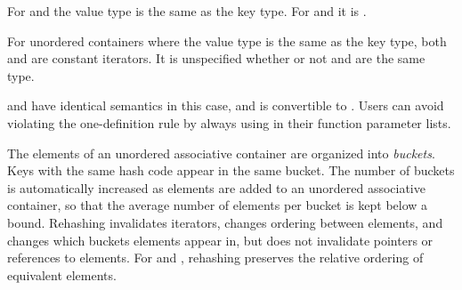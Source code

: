 \pnum
For  and  the value type is
the same as the key type.  For  and
 it is .

\pnum
For unordered containers where the value type is the same as the key
type, both  and  are constant
iterators. It is unspecified whether or not  and
 are the same type.
\begin{note}
 and  have identical
semantics in this case, and  is convertible to
. Users can avoid violating the one-definition rule
by always using  in their function parameter lists.
\end{note}

\pnum
{}%
%
The elements of an unordered associative container are organized into
\textit{buckets}.  Keys with the same hash code appear in the same
bucket.  The number of buckets is automatically increased as elements
are added to an unordered associative container, so that the average
number of elements per bucket is kept below a bound.  Rehashing
invalidates iterators, changes ordering between elements, and changes
which buckets elements appear in, but does not invalidate pointers or
references to elements. For  and
, rehashing preserves the relative ordering of
equivalent elements.

